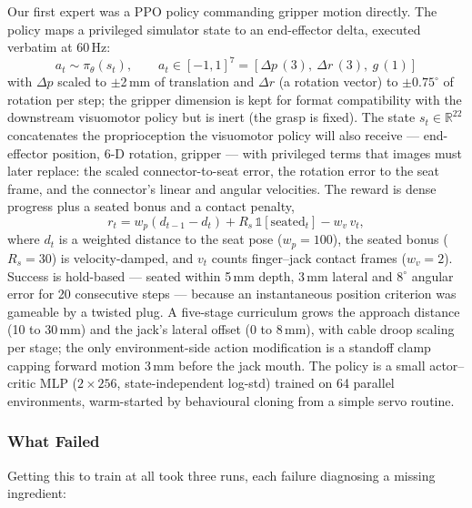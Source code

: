 Our first expert was a PPO policy commanding gripper motion
directly. The policy maps a privileged simulator state to an
end-effector delta, executed verbatim at 60\,Hz:
\begin{equation}
    a_t \sim \pi_\theta(s_t), \qquad
    a_t \in [-1,1]^7 = [\Delta p\,(3),\ \Delta r\,(3),\ g\,(1)]
\end{equation}
with $\Delta p$ scaled to $\pm$2\,mm of translation and $\Delta r$
(a rotation vector) to $\pm 0.75^{\circ}$ of rotation per step; the
gripper dimension is kept for format compatibility with the
downstream visuomotor policy but is inert (the grasp is fixed). The
state $s_t \in \mathbb{R}^{22}$ concatenates the proprioception the
visuomotor policy will also receive --- end-effector position, 6-D
rotation, gripper --- with privileged terms that images must later
replace: the scaled connector-to-seat error, the rotation error to
the seat frame, and the connector's linear and angular velocities.
The reward is dense progress plus a seated bonus and a contact
penalty,
\begin{equation}
    r_t = w_p \left( d_{t-1} - d_t \right)
        + R_s\, \mathds{1}[\text{seated}_t]
        - w_v\, v_t ,
\end{equation}
where $d_t$ is a weighted distance to the seat pose ($w_p = 100$),
the seated bonus ($R_s = 30$) is velocity-damped, and $v_t$ counts
finger--jack contact frames ($w_v = 2$). Success is hold-based ---
seated within 5\,mm depth, 3\,mm lateral and $8^{\circ}$ angular
error for 20 consecutive steps --- because an instantaneous position
criterion was gameable by a twisted plug. A five-stage curriculum
grows the approach distance (10 to 30\,mm) and the jack's lateral
offset (0 to 8\,mm), with cable droop scaling per stage; the only
environment-side action modification is a standoff clamp capping
forward motion 3\,mm before the jack mouth. The policy is a small
actor--critic MLP ($2\times256$, state-independent log-std) trained
on 64 parallel environments, warm-started by behavioural cloning
from a simple servo routine.

\subsubsection{What Failed}

Getting this to train at all took three runs, each failure
diagnosing a missing ingredient:

